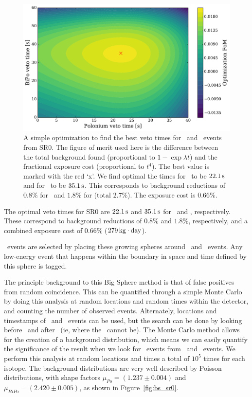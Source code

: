 \begin{figure}[htb]
    \centering
    \includegraphics[width=\textwidth]{figures/rnveto/veto_time_optimization_sr0}
    \caption{A simple optimization to find the best veto times for \Po~and \BiPo~events from SR0. The figure of merit used here is the difference between the total background found (proportional to $1-\exp \lambda t$) and the fractional exposure cost (proportional to $t^4$). The best value is marked with the red `x'. We find optimal the times for \Po~to be $22.1\,\mathrm{s}$ and for \BiPo~to be $35.1\,\mathrm{s}$. This corresponds to background reductions of $0.8\%$ for \Po~and $1.8\%$ for \BiPo (total $2.7\%$). The exposure cost is $0.66\%$.}\label{fig:veto_time_optimization}
\end{figure}

The optimal veto times for SR0 are $22.1\,\mathrm{s}$ and $35.1\,\mathrm{s}$ for \Po~and \BiPo, respectively. These correspond to background reductions of $0.8\%$ and $1.8\%$, respectively, and a combined exposure cost of $0.66\%$ ($279\,\mathrm{kg\cdot day}$).

\Pb~events are selected by placing these growing spheres around \Po~and \BiPo~events. Any low-energy event that happens within the boundary in space and time defined by this sphere is tagged.

The principle background to this Big Sphere method is that of false positives from random coincidence. This can be quantified through a simple Monte Carlo by doing this analysis at random locations and random times within the detector, and counting the number of observed events. Alternately, locations and timestamps of \Po~and \BiPo~events can be used, but the search can be done by looking before \Po~and after \BiPo~(ie, where the \Pb~cannot be). The Monte Carlo method allows for the creation of a background distribution, which means we can easily quantify the significance of the result when we look for \Pb~events from \Po~and \BiPo~events. We perform this analysis at random locations and times a total of $10^{5}$ times for each isotope. The background distributions are very well described by Poisson distributions, with shape factors $\mu_{Po} = (1.237 \pm 0.004)$ and $\mu_{BiPo} = (2.420 \pm 0.005)$, as shown in Figure~\ref{fig:bs_sr0}.

